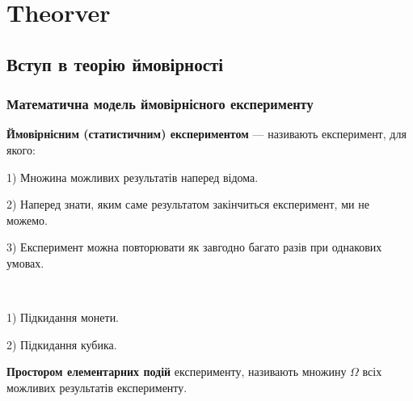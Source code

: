 \chapter{Theorver}

\section{Вступ в теорію ймовірності}

\subsection{Математична модель ймовірнісного експерименту}

\begin{definition}
    \textbf{Ймовірнісним (статистичним) експериментом} ---
    називають експеримент, для якого:

    1) Множина можливих результатів наперед відома.

    2) Наперед знати, яким саме результатом закінчиться
    експеримент, ми не можемо.

    3) Експеримент можна повторювати як завгодно багато
    разів при однакових умовах.
\end{definition}

\begin{example}~\par
    1) Підкидання монети.

    2) Підкидання кубика.
\end{example}

\begin{definition}
    \textbf{Простором елементарних подій} експерименту,
    називають множину $\Omega$ всіх можливих результатів
    експерименту.
\end{definition}

